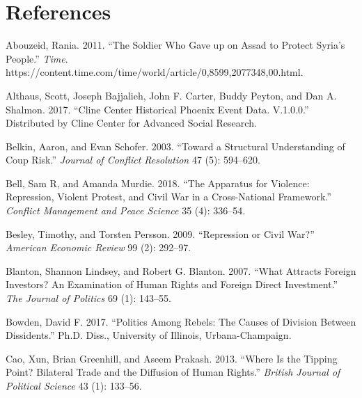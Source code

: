 \documentclass[12pt,]{article}
\theoremstyle{definition}
\theoremstyle{definition}
\theoremstyle{definition}
\theoremstyle{remark}
\begin{document}
\hypertarget{references}{%
\section*{References}\label{references}}


\indent

\setlength{\parindent}{-0.2in}
\setlength{\leftskip}{0.2in}
\setlength{\parskip}{8pt}

\singlespacing

\hypertarget{refs}{}
\leavevmode\hypertarget{ref-Abouzeid2011}{}%
Abouzeid, Rania. 2011. ``The Soldier Who Gave up on Assad to Protect
Syria's People.'' \emph{Time}.
https://content.time.com/time/world/article/0,8599,2077348,00.html.

\leavevmode\hypertarget{ref-Althaus2017}{}%
Althaus, Scott, Joseph Bajjalieh, John F. Carter, Buddy Peyton, and Dan
A. Shalmon. 2017. ``Cline Center Historical Phoenix Event Data.
V.1.0.0.'' Distributed by Cline Center for Advanced Social Research.

\leavevmode\hypertarget{ref-Belkin2003}{}%
Belkin, Aaron, and Evan Schofer. 2003. ``Toward a Structural
Understanding of Coup Risk.'' \emph{Journal of Conflict Resolution} 47
(5): 594--620.

\leavevmode\hypertarget{ref-Bell2018}{}%
Bell, Sam R, and Amanda Murdie. 2018. ``The Apparatus for Violence:
Repression, Violent Protest, and Civil War in a Cross-National
Framework.'' \emph{Conflict Management and Peace Science} 35 (4):
336--54.

\leavevmode\hypertarget{ref-Besley2009}{}%
Besley, Timothy, and Torsten Persson. 2009. ``Repression or Civil War?''
\emph{American Economic Review} 99 (2): 292--97.

\leavevmode\hypertarget{ref-Blanton2007}{}%
Blanton, Shannon Lindsey, and Robert G. Blanton. 2007. ``What Attracts
Foreign Investors? An Examination of Human Rights and Foreign Direct
Investment.'' \emph{The Journal of Politics} 69 (1): 143--55.

\leavevmode\hypertarget{ref-Bowden2017}{}%
Bowden, David F. 2017. ``Politics Among Rebels: The Causes of Division
Between Dissidents.'' Ph.D. Diss., University of Illinois,
Urbana-Champaign.

\leavevmode\hypertarget{ref-Cao2013}{}%
Cao, Xun, Brian Greenhill, and Aseem Prakash. 2013. ``Where Is the
Tipping Point? Bilateral Trade and the Diffusion of Human Rights.''
\emph{British Journal of Political Science} 43 (1): 133--56.
\end{document}

